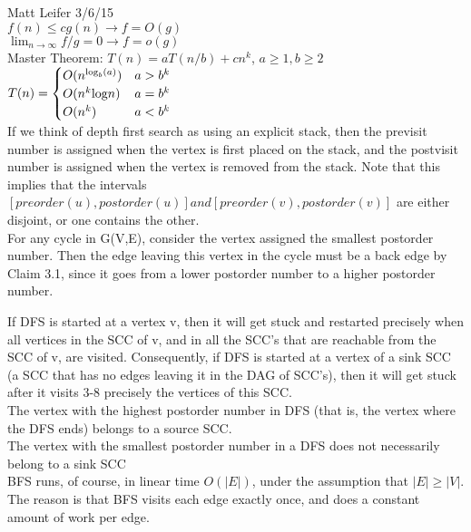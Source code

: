 \documentclass{article}
\begin{document}
	
\noindent Matt Leifer \hspace{5.5in} 3/6/15\\

\noindent $f(n) \leq cg(n) \to f = O(g)$ \\
$\displaystyle\lim_{n\to\infty} f/g = 0 \to f = o(g)$  \\


\noindent Master Theorem: 
$T(n) = a T(n/b) + cn^k$, $a\geq 1, b\geq 2$ \\
$T(n) = \begin{cases}
	O(n^{\textup{log}_b(a)}) & a > b^k \\
	O(n^k\textup{log}n) & a = b^k \\
	O(n^k) & a < b^k \\
\end{cases}$\\


\noindent
If we think of depth first search as using an explicit stack, then the previsit number is assigned when the vertex is first placed on the stack, and the postvisit number is assigned when the vertex is removed from the stack. Note that this implies that the intervals $[preorder(u), postorder(u)] and [preorder(v), postorder(v)]$ are either disjoint, or one contains the other. \\

\noindent  For any cycle in G(V,E), consider the vertex assigned the smallest postorder number. Then the
edge leaving this vertex in the cycle must be a back edge by Claim 3.1, since it goes from a lower postorder number
to a higher postorder number.

\noindent
If DFS is started at a vertex v, then it will get stuck and restarted precisely when all vertices in the SCC of v, and in all the SCC’s that are reachable from the SCC of v, are visited. Consequently, if DFS is started at a vertex of a sink SCC (a SCC that has no edges leaving it in the DAG of SCC’s), then it will get stuck after it visits 3-8 precisely the vertices of this SCC. \\

\noindent
The vertex with the highest postorder number in DFS (that is, the vertex where the DFS ends) belongs to a source SCC. \\

\noindent
The vertex with the smallest postorder number in a DFS does not necessarily belong to a sink SCC \\

\noindent
BFS runs, of course, in linear time $O(|E|)$, under the assumption that $|E| \geq |V|$. The reason is that BFS visits
each edge exactly once, and does a constant amount of work per edge. \\
\end{document}
